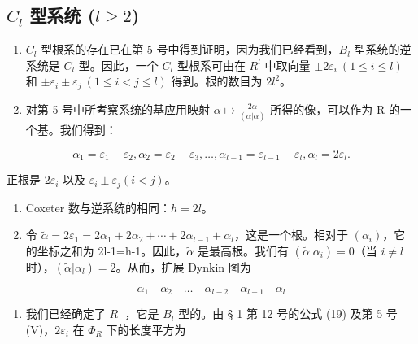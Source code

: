 \subsection{\texorpdfstring{\(C_{l}\) 型系统 (\(l \geqslant 2\))}{C\_l 型系统 (l >= 2)}}

\begin{enumerate}
\def\labelenumi{(\Roman{enumi})}
\item
  \(C_{l}\) 型根系的存在已在第 5 号中得到证明，因为我们已经看到，\(B_{l}\) 型系统的逆系统是 \(C_{l}\) 型。因此，一个 \(C_{l}\) 型根系可由在 \(R^{l}\) 中取向量 \(\pm2\varepsilon_{i}\ (1\leqslant i\leqslant l)\) 和 \(\pm\varepsilon_{i}\pm\varepsilon_{j}\ (1\leqslant i<j\leqslant l)\) 得到。根的数目为 \(2l^{2}\)。
\item
  对第 5 号中所考察系统的基应用映射 \(\alpha\mapsto\frac{2\alpha}{(\alpha|\alpha)}\) 所得的像，可以作为 R 的一个基。我们得到：
\end{enumerate}

\[
\alpha_ {1} = \varepsilon_ {1} - \varepsilon_ {2}, \alpha_ {2} = \varepsilon_ {2} - \varepsilon_ {3}, \dots , \alpha_ {l - 1} = \varepsilon_ {l - 1} - \varepsilon_ {l}, \alpha_ {l} = 2 \varepsilon_ {l}.
\]

正根是 \(2\varepsilon_{i}\) 以及 \(\varepsilon_{i} \pm \varepsilon_{j} (i < j)\)。

\begin{enumerate}
\def\labelenumi{(\Roman{enumi})}
\setcounter{enumi}{2}
\item
  Coxeter 数与逆系统的相同：\(h = 2l\)。
\item
  令 \(\tilde{\alpha}=2\varepsilon_{1}=2\alpha_{1}+2\alpha_{2}+\cdots+2\alpha_{l-1}+\alpha_{l}\)，这是一个根。相对于 \((\alpha_{i})\)，它的坐标之和为 2l-1=h-1。因此，\(\tilde{\alpha}\) 是最高根。我们有 \((\tilde{\alpha}|\alpha_{i})=0\)（当 \(i\neq l\) 时），\((\tilde{\alpha}|\alpha_{l})=2\)。从而，扩展 Dynkin 图为
\end{enumerate}

\[
\alpha_ {1} \quad \alpha_ {2} \quad \dots \quad \alpha_ {l - 2} \quad \alpha_ {l - 1} \quad \alpha_ {l}
\]

\begin{enumerate}
\def\labelenumi{(\Alph{enumi})}
\setcounter{enumi}{21}
\tightlist
\item
  我们已经确定了 \(R^{-}\)，它是 \(B_{l}\) 型的。由 § 1 第 12 号的公式 (19) 及第 5 号 (V)，\(2\varepsilon_{i}\) 在 \(\Phi_{R}\) 下的长度平方为
\end{enumerate}


